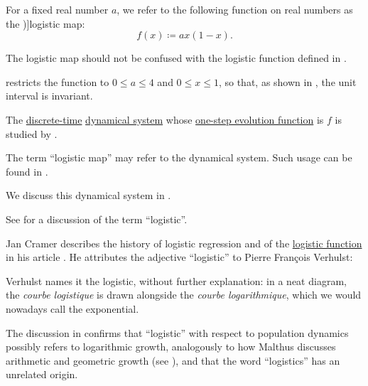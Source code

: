 \begin{definition}\label{def:logistic_map}\mimprovised
  For a fixed real number \( a \), we refer to the following function on real numbers as the \term[en=logistic map (\cite[22]{Müller2022HandbookOfDynamicsAndProbability})]{logistic map}:
  \begin{equation}\label{eq:def:logistic_map}
    f(x) \coloneqq a x (1 - x).
  \end{equation}
\end{definition}
\begin{comments}
  \item The logistic map should not be confused with the logistic function defined in .

  \item {} restricts the function to \( 0 \leq a \leq 4 \) and \( 0 \leq x \leq 1 \), so that, as shown in , the unit interval is invariant.

  The \hyperref[def:discrete_dynamical_system]{discrete-time} \hyperref[def:dynamical_system]{dynamical system} whose \hyperref[def:one_step_evolution_function]{one-step evolution function} is \( f \) is studied by .

  The term \enquote{logistic map} may refer to the dynamical system. Such usage can be found in \cite[353]{Strogatz1994NonlinearDynamics}.

  We discuss this dynamical system in .

  \item See  for a discussion of the term \enquote{logistic}.
\end{comments}

\begin{remark}\label{rem:logistic_model_etymology}
  Jan Cramer describes the history of logistic regression and of the \hyperref[def:logistic_function]{logistic function} in his article \cite{Cramer2003OriginsOfLogisticRegression}. He attributes the adjective \enquote{logistic} to Pierre Fran\c{c}ois Verhulst:
  \begin{displayquote}
    Verhulst names it the logistic, without further explanation: in a neat diagram, the \textit{courbe logistique} is drawn alongside the \textit{courbe logarithmique}, which we would nowadays call the exponential.
  \end{displayquote}

  The discussion in \cite{HSMSE:logistic_growth_etymology} confirms that \enquote{logistic} with respect to population dynamics possibly refers to logarithmic growth, analogously to how Malthus discusses arithmetic and geometric growth (see ), and that the word \enquote{logistics} has an unrelated origin.
\end{remark}

